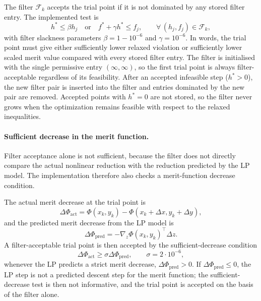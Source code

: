 The filter $\mathcal{F}_k$ accepts the trial point if it is not
dominated by any stored filter entry. The implemented test is
\begin{equation}
\label{eq:appA_filter_accept}
    h^* \leq \beta h_j
    \quad \text{or} \quad
    f^* + \gamma h^* \leq f_j,
    \qquad
    \forall\,(h_j,f_j)\in\mathcal{F}_k ,
\end{equation}
with filter slackness parameters $\beta = 1-10^{-6}$ and
$\gamma = 10^{-6}$. In words, the trial point must give either
sufficiently lower relaxed violation or sufficiently lower scaled
merit value compared with every stored filter entry. The filter is
initialised with the single permissive entry $(\infty,\infty)$, so
the first trial point is always filter-acceptable regardless of its
feasibility. After an accepted infeasible step ($h^*>0$), the new
filter pair is inserted into the filter and entries dominated by the
new pair are removed. Accepted points with $h^*=0$ are not stored, so
the filter never grows when the optimization remains feasible with
respect to the relaxed inequalities.

\paragraph{Sufficient decrease in the merit function.}

Filter acceptance alone is not sufficient, because the filter does
not directly compare the actual nonlinear reduction with the
reduction predicted by the LP model. The implementation therefore
also checks a merit-function decrease condition.

The actual merit decrease at the trial point is
\begin{equation}
\label{eq:appA_merit_actual}
    \Delta\Phi_{\mathrm{act}}
    =
    \Phi(x_k,y_k)
    -
    \Phi(x_k+\Delta x, y_k+\Delta y),
\end{equation}
and the predicted merit decrease from the LP model is
\begin{equation}
\label{eq:appA_merit_pred}
    \Delta\Phi_{\mathrm{pred}}
    =
    -\nabla_z\Phi(x_k,y_k)^{\!\top}\Delta z .
\end{equation}
A filter-acceptable trial point is then accepted by the
sufficient-decrease condition
\begin{equation}
\label{eq:appA_armijo}
    \Delta\Phi_{\mathrm{act}} \geq \sigma\Delta\Phi_{\mathrm{pred}},
    \qquad
    \sigma = 2\cdot 10^{-6} ,
\end{equation}
whenever the LP predicts a strict merit decrease,
$\Delta\Phi_{\mathrm{pred}}>0$. If $\Delta\Phi_{\mathrm{pred}}\leq 0$,
the LP step is not a predicted descent step for the merit function;
the sufficient-decrease test is then not informative, and the trial
point is accepted on the basis of the filter alone.

